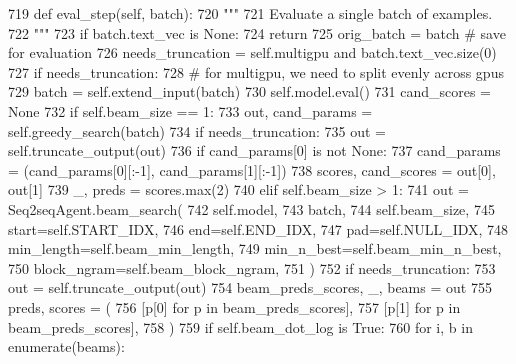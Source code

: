 \begin{DoxyCode}
719     \textcolor{keyword}{def }eval\_step(self, batch):
720         \textcolor{stringliteral}{"""}
721 \textcolor{stringliteral}{        Evaluate a single batch of examples.}
722 \textcolor{stringliteral}{        """}
723         \textcolor{keywordflow}{if} batch.text\_vec \textcolor{keywordflow}{is} \textcolor{keywordtype}{None}:
724             \textcolor{keywordflow}{return}
725         orig\_batch = batch  \textcolor{comment}{# save for evaluation}
726         needs\_truncation = self.multigpu \textcolor{keywordflow}{and} batch.text\_vec.size(0) %
727         \textcolor{keywordflow}{if} needs\_truncation:
728             \textcolor{comment}{# for multigpu, we need to split evenly across gpus}
729             batch = self.extend\_input(batch)
730         self.model.eval()
731         cand\_scores = \textcolor{keywordtype}{None}
732         \textcolor{keywordflow}{if} self.beam\_size == 1:
733             out, cand\_params = self.greedy\_search(batch)
734             \textcolor{keywordflow}{if} needs\_truncation:
735                 out = self.truncate\_output(out)
736                 \textcolor{keywordflow}{if} cand\_params[0] \textcolor{keywordflow}{is} \textcolor{keywordflow}{not} \textcolor{keywordtype}{None}:
737                     cand\_params = (cand\_params[0][:-1], cand\_params[1][:-1])
738             scores, cand\_scores = out[0], out[1]
739             \_, preds = scores.max(2)
740         \textcolor{keywordflow}{elif} self.beam\_size > 1:
741             out = Seq2seqAgent.beam\_search(
742                 self.model,
743                 batch,
744                 self.beam\_size,
745                 start=self.START\_IDX,
746                 end=self.END\_IDX,
747                 pad=self.NULL\_IDX,
748                 min\_length=self.beam\_min\_length,
749                 min\_n\_best=self.beam\_min\_n\_best,
750                 block\_ngram=self.beam\_block\_ngram,
751             )
752             \textcolor{keywordflow}{if} needs\_truncation:
753                 out = self.truncate\_output(out)
754             beam\_preds\_scores, \_, beams = out
755             preds, scores = (
756                 [p[0] \textcolor{keywordflow}{for} p \textcolor{keywordflow}{in} beam\_preds\_scores],
757                 [p[1] \textcolor{keywordflow}{for} p \textcolor{keywordflow}{in} beam\_preds\_scores],
758             )
759             \textcolor{keywordflow}{if} self.beam\_dot\_log \textcolor{keywordflow}{is} \textcolor{keyword}{True}:
760                 \textcolor{keywordflow}{for} i, b \textcolor{keywordflow}{in} enumerate(beams):

\end{DoxyCode}

